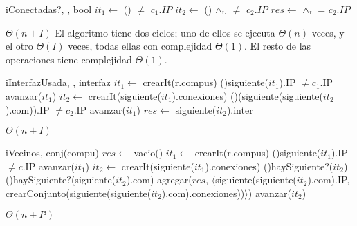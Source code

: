 \begin{Algoritmos}
  \nuevoAlgo
  \begin{algoritmo}{iConectadas?}{, , }{bool}{}
     $it_1 \gets$  
    \While(){ $\neq$ $c_1.IP$}{
       
    }
     $it_2 \gets$  
    \While(){ $\land_{\mathrm{\scriptscriptstyle{L}}}$  $\neq$ $c_2.IP$}{
       
    }
    $res \gets$  $\land_{\mathrm{\scriptscriptstyle{L}}}$  = $c_2.IP$ 
  \end{algoritmo}  
  \datosAlgoritmo{} %
  {} %
  {} %
  {$\Theta(n+I)$} %
  {El algoritmo tiene dos ciclos; uno de ellos se ejecuta $\Theta(n)$ veces, y el otro $\Theta(I)$ veces, todas ellas con complejidad $\Theta(1)$. El resto de las operaciones tiene complejidad $\Theta(1)$.} %

  \nuevoAlgo
  \begin{algoritmo}{iInterfazUsada}{, , }{interfaz}{}
     $it_{1} \gets$ crearIt(r.compus)  
    \While(){siguiente($it_{1}$).IP $\neq c_{1}$.IP}{
      avanzar($it_{1}$)
    }
     $it_{2} \gets$ crearIt(siguiente($it_{1}$).conexiones)
    \While(){(siguiente(siguiente($it_{2}$).com)).IP $\neq c_{2}$.IP}{
      avanzar($it_{1}$)
    }
    $res \gets$ siguiente($it_{2}$).inter
  \end{algoritmo}  
  \datosAlgoritmo{} %
  {} %
  {} %
  {$\Theta(n+I)$} %
  {} %
    
  \begin{algoritmo}{iVecinos}{, }{conj(compu)}{}
    $res \gets$ vacio() 
     $it_{1} \gets$ crearIt(r.compus) 
    \While(){siguiente($it_{1}$).IP $\neq c$.IP}{
      avanzar($it_{1}$) 
    }
     $it_{2} \gets$ crearIt(siguiente($it_{1}$).conexiones) 
    \While(){haySiguiente?($it_{2}$)}{
      \If(){haySiguiente?(siguiente($it_{2}$).com)}{
        agregar($res$, $\langle$siguiente(siguiente($it_{2}$).com).IP, crearConjunto(siguiente(siguiente($it_{2}$).com).conexiones))$\rangle$)
      }
      avanzar($it_{2}$)
    }
  \end{algoritmo}
  \datosAlgoritmo{} %
  {} %
  {} %
  {$\Theta(n+I³)$} %
  {} %
  

\end{Algoritmos}
